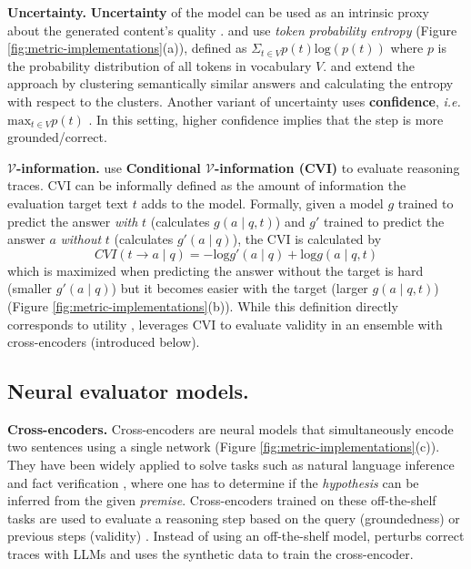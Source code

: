 \textbf{Uncertainty.} \textbf{Uncertainty} of the model can be used as an intrinsic proxy about the generated content's quality \citep{xiao-wang-2021-hallucination, zhang-etal-2023-enhancing-uncertainty}. \citet{qiu2024entropybaseddecodingretrievalaugmentedlarge} and \citet{wu-etal-2024-synchronous} use \textit{token probability entropy} (Figure \ref{fig:metric-implementations}(a)), defined as $\Sigma_{t\in V} p(t)\textrm{log}(p(t))$ where $p$ is the probability distribution of all tokens in vocabulary $V$. \citet{farquhar2024detecting} and \citet{kossen2024semanticentropyprobesrobust} extend the approach by clustering semantically similar answers and calculating the entropy with respect to the clusters. Another variant of uncertainty uses \textbf{confidence}, \textit{i.e.} $\textrm{max}_{t\in V} p(t)$ \citep{wu-etal-2024-synchronous, wang2024chainofprobeexamingnecessityaccuracy}. In this setting, higher confidence implies that the step is more grounded/correct.

\textbf{$\mathcal{V}$-information.} \citep{chen-etal-2023-rev, prasad-etal-2023-receval} use \textbf{Conditional $\mathcal{V}$-information (CVI)} \citep{hewitt-etal-2021-conditional} to evaluate reasoning traces. CVI can be informally defined as the amount of information the evaluation target text $t$ adds to the model.
Formally, given a model $g$ trained to predict the answer \textit{with} $t$ (calculates $g(a\mid q,t)$) and $g'$ trained to predict the answer $a$ \textit{without} $t$ (calculates $g'(a\mid q)$), the CVI is calculated by
\[
\mathit{CVI}(t\rightarrow a\mid q) = -\textrm{log}g'(a\mid q) + \textrm{log}g(a\mid q,t)
\]
which is maximized when predicting the answer without the target is hard (smaller $g'(a\mid q)$) but it becomes easier with the target (larger $g(a\mid q,t)$) (Figure \ref{fig:metric-implementations}(b)). While this definition directly corresponds to utility \citep{chen-etal-2023-rev}, \citet{prasad-etal-2023-receval} leverages CVI to evaluate validity in an ensemble with cross-encoders (introduced below).

\subsection{Neural evaluator models.}

\textbf{Cross-encoders.} Cross-encoders are neural models that simultaneously encode two sentences using a single network (Figure \ref{fig:metric-implementations}(c)). They have been widely applied to solve tasks such as natural language inference \citep{bowman-etal-2015-large} and fact verification \citep{thorne-etal-2018-fever}, where one has to determine if the \textit{hypothesis} can be inferred from the given \textit{premise}. Cross-encoders trained on these off-the-shelf tasks are used to evaluate a reasoning step based on the query (groundedness) or previous steps (validity) \citep{wu-etal-2024-synchronous, zha-etal-2023-alignscore, prasad-etal-2023-receval}. Instead of using an off-the-shelf model, \citet{zhu2024deductivebeamsearchdecoding} perturbs correct traces with LLMs and uses the synthetic data to train the cross-encoder.

